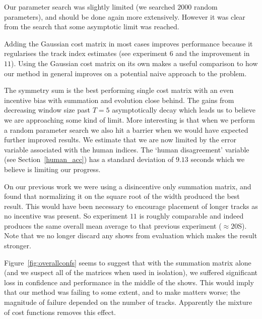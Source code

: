 \documentclass[twocolumn]{article}
\begin{document}
Our parameter search was slightly limited (we searched $2000$ random parameters), and should be done again more extensively. However it was clear from the search that some asymptotic limit was reached. 

Adding the Gaussian cost matrix in most cases improves performance because it regularises the track index estimates (see experiment $6$ and the improvement in $11$). Using the Gaussian cost matrix on its own makes a useful comparison to how our method in general improves on a potential naive approach to the problem. 

The symmetry sum is the best performing single cost matrix with an even incentive bias with summation and evolution close behind. The gains from decreasing window size past $T=5$ asymptotically decay which leads us to believe we are approaching some kind of limit. More interesting is that when we perform a random parameter search we also hit a barrier when we would have expected further improved results. We estimate that we are now limited by the error variable associated with the human indices. The `human disagreement' variable (see Section~\ref{human_acc}) has a standard deviation of $9.13$ seconds which we believe is limiting our progress. 

On our previous work we were using a disincentive only summation matrix, and found that normalizing it on the square root of the width produced the best result. This would have been necessary to encourage placement of longer tracks as no incentive was present. So experiment $11$ is roughly comparable and indeed produces the same overall mean average to that previous experiment ($\approx 20$S). Note that we no longer discard any shows from evaluation which makes the result stronger. 

Figure~\ref{fig:overallconfs} seems to suggest that with the summation matrix alone (and we suspect all of the matrices when used in isolation), we suffered significant loss in confidence and performance in the middle of the shows. This would imply that our method was failing to some extent, and to make matters worse; the magnitude of failure depended on the number of tracks. Apparently the mixture of cost functions removes this effect.
\end{document}
